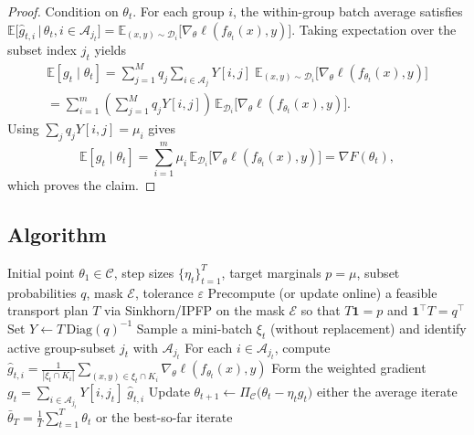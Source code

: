\documentclass[9pt]{extarticle}
\theoremstyle{definition}
\begin{document}
\begin{proof}
Condition on $\theta_t$. For each group $i$, the within-group batch average satisfies
$\mathbb{E}\big[\widehat{g}_{t,i}\,\big|\,\theta_t,i\in\mathcal{A}_{j_t}\big]=\mathbb{E}_{(x,y)\sim\mathcal{D}_i}\big[\nabla_\theta \ell(f_{\theta_t}(x),y)\big]$.
Taking expectation over the subset index $j_t$ yields
\begin{multline}
\mathbb{E}[g_t\mid \theta_t]
= \sum_{j=1}^M q_j \sum_{i\in\mathcal{A}_j} Y[i,j]\;\mathbb{E}_{(x,y)\sim\mathcal{D}_i}\!\big[\nabla_\theta \ell(f_{\theta_t}(x),y)\big]
\\= \sum_{i=1}^m \left(\sum_{j=1}^M q_j Y[i,j]\right)\, \mathbb{E}_{\mathcal{D}_i}\!\big[\nabla_\theta \ell(f_{\theta_t}(x),y)\big].
\end{multline}
Using $\sum_j q_j Y[i,j]=\mu_i$ gives
$$\mathbb{E}[g_t\mid \theta_t] = \sum_{i=1}^m \mu_i\, \mathbb{E}_{\mathcal{D}_i}\!\big[\nabla_\theta \ell(f_{\theta_t}(x),y)\big] = \nabla F(\theta_t),$$ which proves the claim.
\end{proof}
\subsection{Algorithm}
\begin{algorithm}[H]
\caption{\textsc{Projected Transport-Weighted SGD} (FedAVOT)}
\label{alg:fedavot}
\begin{algorithmic}[1]
\Require Initial point $\theta_1\in\mathcal{C}$, step sizes $\{\eta_t\}_{t=1}^T$, target marginals $p=\mu$, subset probabilities $q$, mask $\mathcal{E}$, tolerance $\varepsilon$
\State Precompute (or update online) a feasible transport plan $T$ via Sinkhorn/IPFP on the mask $\mathcal{E}$ so that $T\mathbf{1}=p$ and $\mathbf{1}^\top T=q^\top$
\State Set $Y \gets T\,\mathrm{Diag}(q)^{-1}$ 
    \State Sample a mini-batch $\xi_t$ (without replacement) and identify active group-subset $j_t$ with $\mathcal{A}_{j_t}$
    \State For each $i\in\mathcal{A}_{j_t}$, compute $\widehat{g}_{t,i}=\frac{1}{|\xi_t\cap K_i|}\sum_{(x,y)\in\xi_t\cap K_i} \nabla_\theta \ell(f_{\theta_t}(x),y)$
    \State Form the weighted gradient $g_t = \sum_{i\in\mathcal{A}_{j_t}} Y[i,j_t]\;\widehat{g}_{t,i}$
    \State Update $\theta_{t+1} \gets \Pi_{\mathcal{C}}\!\big(\theta_t - \eta_t g_t\big)$
\EndFor
\State \Return either the average iterate $\bar{\theta}_T=\frac{1}{T}\sum_{t=1}^T \theta_t$ or the best-so-far iterate
\end{algorithmic}
\end{algorithm}
\end{document}
